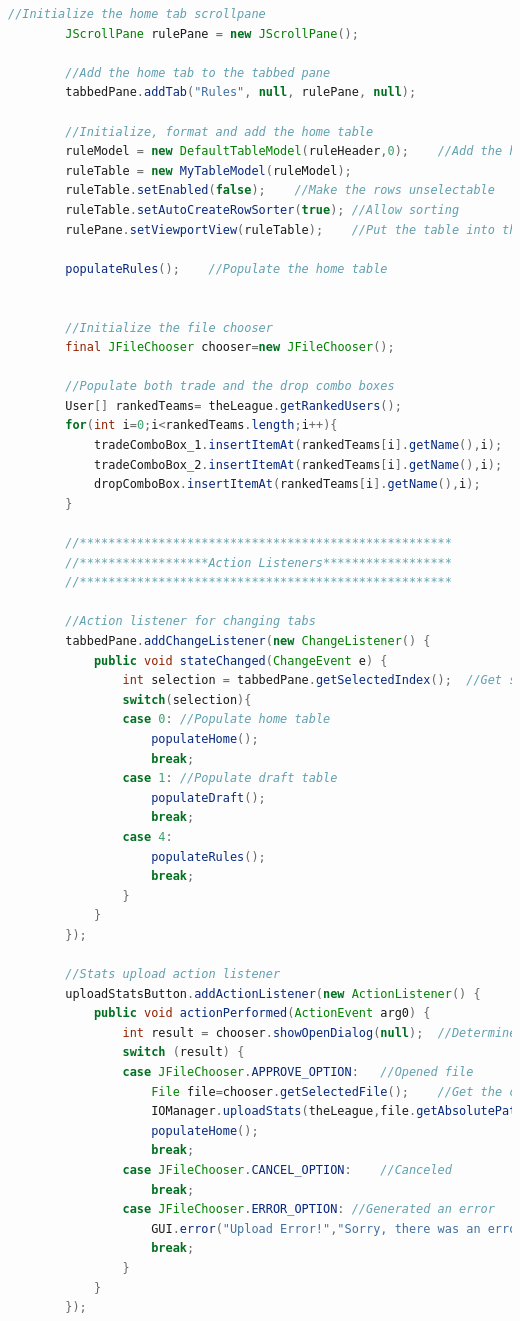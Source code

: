 \documentclass[12pt]{report}
\begin{document}
\begin{singlespace}
\begin{lstlisting}[language=Java,label=some-code,caption={GUI.java}]
		//Initialize the home tab scrollpane
		JScrollPane rulePane = new JScrollPane();
		
		//Add the home tab to the tabbed pane
		tabbedPane.addTab("Rules", null, rulePane, null);
		
		//Initialize, format and add the home table
		ruleModel = new DefaultTableModel(ruleHeader,0);	//Add the header but no rows
		ruleTable = new MyTableModel(ruleModel);
		ruleTable.setEnabled(false);	//Make the rows unselectable
		ruleTable.setAutoCreateRowSorter(true);	//Allow sorting
		rulePane.setViewportView(ruleTable);	//Put the table into the scroll pane
		
		populateRules();	//Populate the home table
		
		
		//Initialize the file chooser
		final JFileChooser chooser=new JFileChooser();
		
		//Populate both trade and the drop combo boxes
		User[] rankedTeams= theLeague.getRankedUsers();
		for(int i=0;i<rankedTeams.length;i++){
			tradeComboBox_1.insertItemAt(rankedTeams[i].getName(),i);
			tradeComboBox_2.insertItemAt(rankedTeams[i].getName(),i);
			dropComboBox.insertItemAt(rankedTeams[i].getName(),i);
		}
		
		//****************************************************
		//******************Action Listeners******************
		//****************************************************
		
		//Action listener for changing tabs
		tabbedPane.addChangeListener(new ChangeListener() {
			public void stateChanged(ChangeEvent e) {
				int selection = tabbedPane.getSelectedIndex();	//Get selected tab
				switch(selection){
				case 0:	//Populate home table
					populateHome();
					break;
				case 1:	//Populate draft table
					populateDraft();
					break;
				case 4:
					populateRules();
					break;
				}
			}
		});
		
		//Stats upload action listener
		uploadStatsButton.addActionListener(new ActionListener() {
			public void actionPerformed(ActionEvent arg0) {
				int result = chooser.showOpenDialog(null);	//Determine what the user pressed
				switch (result) {
				case JFileChooser.APPROVE_OPTION:	//Opened file
					File file=chooser.getSelectedFile();	//Get the chosen file
					IOManager.uploadStats(theLeague,file.getAbsolutePath());	//Pass the file path to the parser method
					populateHome();
					break;
				case JFileChooser.CANCEL_OPTION:	//Canceled
					break;
				case JFileChooser.ERROR_OPTION:	//Generated an error
					GUI.error("Upload Error!","Sorry, there was an error opening the stat file.");
					break;
				}
			}
		});
		

\end{lstlisting}
\end{singlespace}
\end{document}
